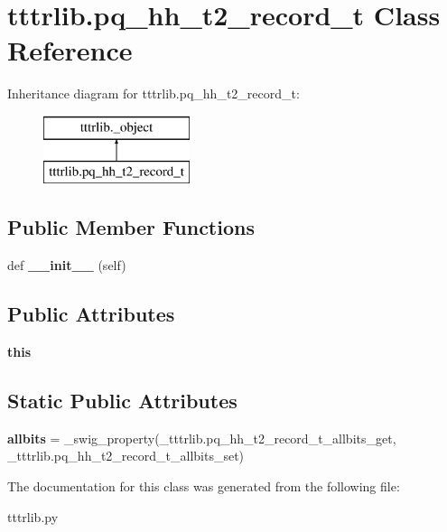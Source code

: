 \hypertarget{classtttrlib_1_1pq__hh__t2__record__t}{}\section{tttrlib.\+pq\+\_\+hh\+\_\+t2\+\_\+record\+\_\+t Class Reference}
\label{classtttrlib_1_1pq__hh__t2__record__t}
Inheritance diagram for tttrlib.\+pq\+\_\+hh\+\_\+t2\+\_\+record\+\_\+t\+:\begin{figure}[H]
\begin{center}
\leavevmode
\includegraphics[height=2.000000cm]{classtttrlib_1_1pq__hh__t2__record__t}
\end{center}
\end{figure}
\subsection*{Public Member Functions}
\begin{DoxyCompactItemize}
\item 
\mbox{\label{classtttrlib_1_1pq__hh__t2__record__t_a2544381fda32ebb74c02eb553e794dca}} 
def {\bfseries \+\_\+\+\_\+init\+\_\+\+\_\+} (self)
\end{DoxyCompactItemize}
\subsection*{Public Attributes}
\begin{DoxyCompactItemize}
\item 
\mbox{\label{classtttrlib_1_1pq__hh__t2__record__t_a1fe2de1c04013530e7343684bfd7f453}} 
{\bfseries this}
\end{DoxyCompactItemize}
\subsection*{Static Public Attributes}
\begin{DoxyCompactItemize}
\item 
\mbox{\label{classtttrlib_1_1pq__hh__t2__record__t_aaa177e89bbb27aea0764cf00f5c79bda}} 
{\bfseries allbits} = \+\_\+swig\+\_\+property(\+\_\+tttrlib.\+pq\+\_\+hh\+\_\+t2\+\_\+record\+\_\+t\+\_\+allbits\+\_\+get, \+\_\+tttrlib.\+pq\+\_\+hh\+\_\+t2\+\_\+record\+\_\+t\+\_\+allbits\+\_\+set)
\end{DoxyCompactItemize}


The documentation for this class was generated from the following file\+:\begin{DoxyCompactItemize}
\item 
tttrlib.\+py\end{DoxyCompactItemize}
